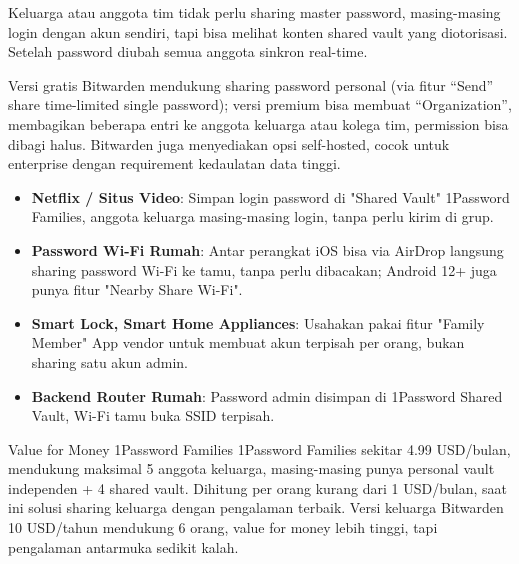 Keluarga atau anggota tim tidak perlu sharing master password, masing-masing login dengan akun sendiri, tapi bisa melihat konten shared vault yang diotorisasi. Setelah password diubah semua anggota sinkron real-time.


Versi gratis Bitwarden mendukung sharing password personal (via fitur “Send” share time-limited single password); versi premium bisa membuat “Organization”, membagikan beberapa entri ke anggota keluarga atau kolega tim, permission bisa dibagi halus. Bitwarden juga menyediakan opsi self-hosted, cocok untuk enterprise dengan requirement kedaulatan data tinggi.


\begin{itemize}
  \item \textbf{Netflix / Situs Video}: Simpan login password di "Shared Vault" 1Password Families, anggota keluarga masing-masing login, tanpa perlu kirim di grup.
  \item \textbf{Password Wi-Fi Rumah}: Antar perangkat iOS bisa via AirDrop langsung sharing password Wi-Fi ke tamu, tanpa perlu dibacakan; Android 12+ juga punya fitur "Nearby Share Wi-Fi".
  \item \textbf{Smart Lock, Smart Home Appliances}: Usahakan pakai fitur "Family Member" App vendor untuk membuat akun terpisah per orang, bukan sharing satu akun admin.
  \item \textbf{Backend Router Rumah}: Password admin disimpan di 1Password Shared Vault, Wi-Fi tamu buka SSID terpisah.
\end{itemize}

\begin{tcbinfo}{Value for Money 1Password Families}
1Password Families sekitar 4.99 USD/bulan, mendukung maksimal 5 anggota keluarga, masing-masing punya personal vault independen + 4 shared vault. Dihitung per orang kurang dari 1 USD/bulan, saat ini solusi sharing keluarga dengan pengalaman terbaik. Versi keluarga Bitwarden 10 USD/tahun mendukung 6 orang, value for money lebih tinggi, tapi pengalaman antarmuka sedikit kalah.

\end{tcbinfo}


